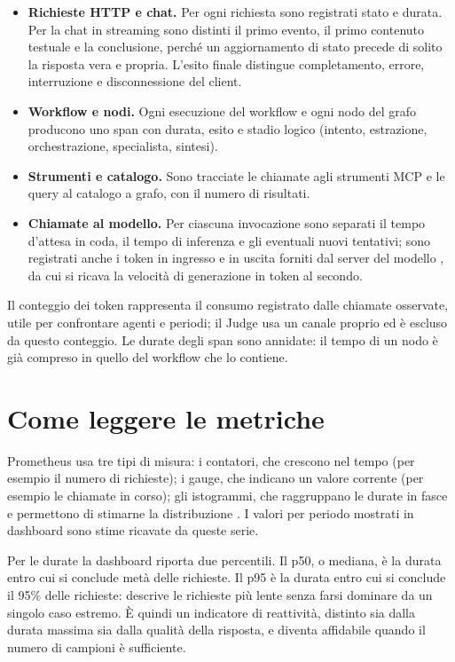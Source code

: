 \begin{itemize}
    \item \textbf{Richieste HTTP e chat.} Per ogni richiesta sono registrati
    stato e durata. Per la chat in streaming sono distinti il primo evento,
    il primo contenuto testuale e la conclusione, perché un aggiornamento di
    stato precede di solito la risposta vera e propria. L'esito finale
    distingue completamento, errore, interruzione e disconnessione del client.
    \item \textbf{Workflow e nodi.} Ogni esecuzione del workflow e ogni nodo
    del grafo producono uno span con durata, esito e stadio logico (intento,
    estrazione, orchestrazione, specialista, sintesi).
    \item \textbf{Strumenti e catalogo.} Sono tracciate le chiamate agli
    strumenti MCP e le query al catalogo a grafo, con il numero di risultati.
    \item \textbf{Chiamate al modello.} Per ciascuna invocazione sono separati
    il tempo d'attesa in coda, il tempo di inferenza e gli eventuali nuovi
    tentativi; sono registrati anche i token in ingresso e in uscita forniti
    dal server del modello \cite{ollamaUsage}, da cui si ricava la velocità di
    generazione in token al secondo.
\end{itemize}

Il conteggio dei token rappresenta il consumo registrato dalle chiamate
osservate, utile per confrontare agenti e periodi; il Judge usa un canale
proprio ed è escluso da questo conteggio. Le durate degli span sono annidate:
il tempo di un nodo è già compreso in quello del workflow che lo contiene.

\section{Come leggere le metriche}

Prometheus usa tre tipi di misura: i contatori, che crescono nel tempo (per
esempio il numero di richieste); i gauge, che indicano un valore corrente (per
esempio le chiamate in corso); gli istogrammi, che raggruppano le durate in
fasce e permettono di stimarne la distribuzione \cite{prometheusHistograms}.
I valori per periodo mostrati in dashboard sono stime ricavate da queste serie.

Per le durate la dashboard riporta due percentili. Il p50, o mediana, è la
durata entro cui si conclude metà delle richieste. Il p95 è la durata entro cui
si conclude il 95\% delle richieste: descrive le richieste più lente senza
farsi dominare da un singolo caso estremo. È quindi un indicatore di
reattività, distinto sia dalla durata massima sia dalla qualità della risposta,
e diventa affidabile quando il numero di campioni è sufficiente.


